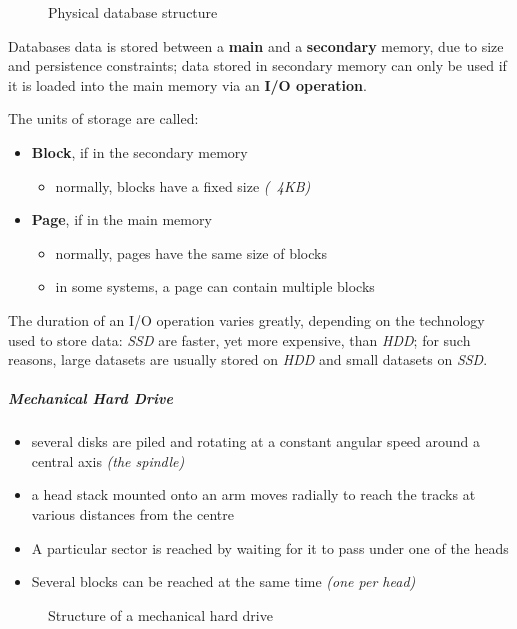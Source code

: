 \documentclass[english]{article}
\begin{document}
\begin{figure}[htbp]
  \centering
  \bigskip
  \caption{Physical database structure}
  \label{fig:physical-database}
  \bigskip
\end{figure}

Databases data is stored between a \textbf{main} and a \textbf{secondary} memory, due to size and persistence constraints;
data stored in secondary memory can only be used if it is loaded into the main memory via an \textbf{I/O operation}.

The units of storage are called:
\begin{itemize}
  \item \textbf{Block}, if in the secondary memory
        \begin{itemize}
          \item normally, blocks have a fixed size \textit{(~4KB)}
        \end{itemize}
  \item \textbf{Page}, if in the main memory
        \begin{itemize}
          \item normally, pages have the same size of blocks
          \item in some systems, a page can contain multiple blocks
        \end{itemize}
\end{itemize}

The duration of an I/O operation varies greatly, depending on the technology used to store data:
\textit{SSD} are faster, yet more expensive, than \textit{HDD};
for such reasons, large datasets are usually stored on \textit{HDD} and small datasets on \textit{SSD}.

\subparagraph*{Mechanical Hard Drive}
\begin{itemize}
  \item several disks are piled and rotating at a constant angular speed around a central axis \textit{(the spindle)}
  \item a head stack mounted onto an arm moves radially to reach the tracks at various distances from the centre
  \item A particular sector is reached by waiting for it to pass under one of the heads
  \item Several blocks can be reached at the same time \textit{(one per head)}
\end{itemize}

\begin{figure}[htbp]
  \centering
  \bigskip
  \caption{Structure of a mechanical hard drive}
  \label{figure:hdd-structure}
  \bigskip
\end{figure}
\end{document}
